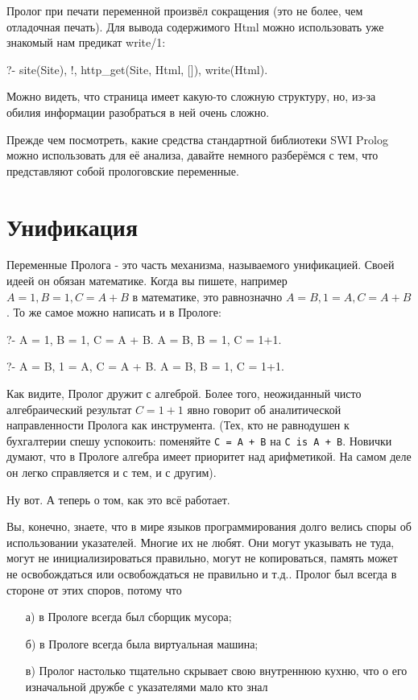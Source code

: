 \documentclass[a4paper]{book}
\def\itd{и т.\thinspace д.}
\begin{document}
Пролог при печати переменной произвёл сокращения (это не более,
чем отладочная печать). Для вывода содержимого Html можно
использовать уже знакомый нам предикат write/1:

\begin{example}{}{}
?- site(Site), !, http_get(Site, Html, []), write(Html).
\end{example}

Можно видеть, что страница имеет какую-то сложную структуру, но,
из-за обилия информации разобраться в ней очень сложно.

Прежде чем посмотреть, какие средства стандартной библиотеки SWI
Prolog можно использовать для её анализа, давайте немного
разберёмся с тем, что представляют собой прологовские переменные.

\section{Унификация}

Переменные Пролога - это часть механизма, называемого
унификацией. Своей идеей он обязан математике. Когда вы пишете,
например $A = 1, B = 1, C = A + B$ в математике, это равнозначно
$A = B, 1 = A, C = A + B$. То же самое можно написать и в
Прологе:

\begin{example}{}{}
?- A = 1, B = 1, C = A + B.
A = B, B = 1,
C = 1+1.

?- A = B, 1 = A, C = A + B.
A = B, B = 1,
C = 1+1.
\end{example}

Как видите, Пролог дружит с алгеброй. Более того, неожиданный
чисто алгебраический результат $C=1+1$ явно говорит об
аналитической направленности Пролога как инструмента. (Тех, кто
не равнодушен к бухгалтерии спешу успокоить: поменяйте
\verb|C = A + B| на \verb|C is A + B|. Новички думают, что в
Прологе алгебра имеет приоритет над арифметикой. На самом деле он
легко справляется и с тем, и с другим).

Ну вот. А теперь о том, как это всё работает.

Вы, конечно, знаете, что в мире языков программирования долго
велись споры об использовании указателей. Многие их не любят. Они
могут указывать не туда, могут не инициализироваться правильно,
могут не копироваться, память может не освобождаться или
освобождаться не правильно \itd. Пролог был всегда в стороне от
этих споров, потому что

\begin{itemize}
\item[а)] в Прологе всегда был сборщик мусора;
\item[б)] в Прологе всегда была виртуальная машина;
\item[в)] Пролог настолько тщательно скрывает свою внутреннюю
  кухню, что о его изначальной дружбе с указателями мало кто
  знал
\end{itemize}
\end{document}
